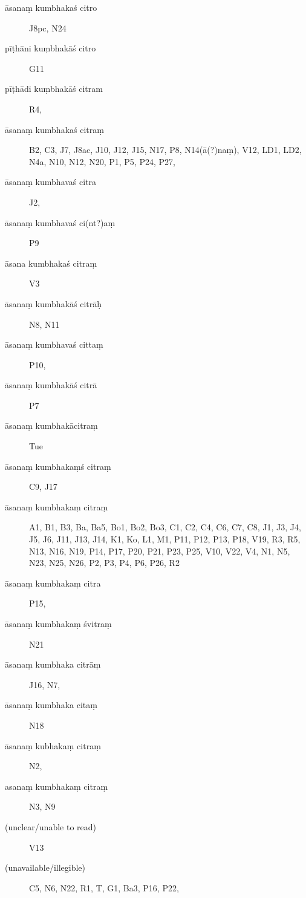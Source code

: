 \begin{ekdosis}
\begin{marma}[hp01_055]
\begin{marma}[hp01_056]
  \begin{description}
  \item[āsanaṃ kumbhakaś citro] J8pc, N24
\item[pīṭhāni kuṃbhakāś citro] G11
\item[pīṭhādi kuṃbhakāś citram] R4, 
  \item[āsanaṃ kumbhakaś citraṃ] B2, C3, J7, J8ac, J10, J12, J15, N17, P8, N14(ā(?)naṃ), V12, LD1, LD2, N4a, N10, N12, N20, P1, P5, P24, P27, 
  \item[āsanaṃ kumbhavaś citra] J2,
\item[āsanaṃ kumbhavaś ci(nt?)aṃ] P9
  \item[āsana kumbhakaś citraṃ] V3
\item[āsanaṃ kumbhakāś citrāḥ]  N8, N11
  \item[āsanaṃ kumbhavaś cittaṃ] P10, 
\item[āsanaṃ kumbhakāś citrā]   P7
\item[āsanaṃ kumbhakācitraṃ]   Tue
  \item[āsanaṃ kumbhakaṃś citraṃ] C9, J17
  \item[āsanaṃ kumbhakaṃ citraṃ] A1, B1, B3, Ba, Ba5, Bo1, Bo2, Bo3, C1, C2, C4, C6, C7, C8, J1, J3, J4, J5, J6, J11, J13, J14, K1, Ko, L1, M1, P11, P12, P13, P18, V19, R3, R5, N13, N16, N19, P14, P17, P20, P21, P23, P25, V10, V22, V4, N1, N5, N23, N25, N26, P2, P3, P4, P6, P26, R2
  \item[āsanaṃ kumbhakaṃ citra] P15,
\item[āsanaṃ kumbhakaṃ śvitraṃ]   N21   
  \item[āsanaṃ kumbhaka citrāṃ] J16, N7,
  \item[āsanaṃ kumbhaka citaṃ] N18
\item[āsanaṃ kubhakaṃ citraṃ] N2, 
\item[asanaṃ kumbhakaṃ citraṃ] N3, N9
  \item[(unclear/unable to read)] V13
\item[(unavailable/illegible)]    C5, N6, N22, R1, T, G1, Ba3, P16, P22,
    \end{description}


\end{marma}
\end{marma}
\end{ekdosis}
